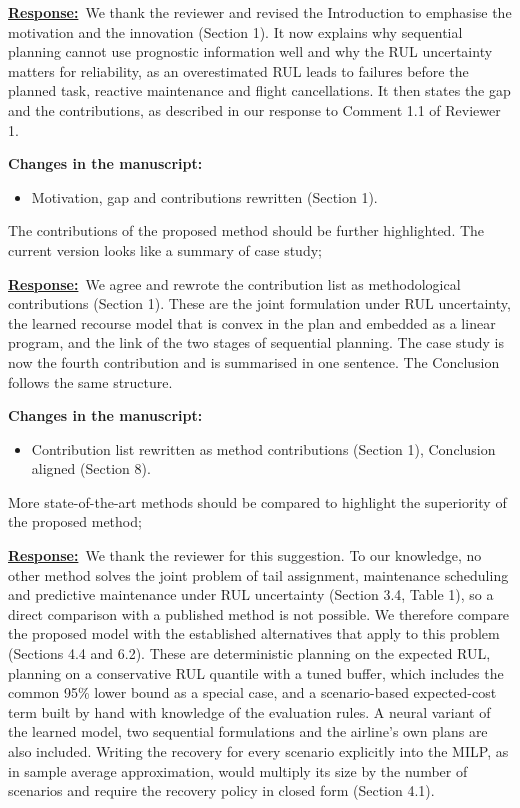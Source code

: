 \documentclass{article}
\newcommand{\response}{\vspace{0.1cm}\noindent\underline{\textbf{Response:}}\ }
\newcommand{\changes}{\vspace{0.1cm}\noindent\textbf{Changes in the manuscript:}}
\begin{document}
\response We thank the reviewer and revised the Introduction to emphasise the motivation and the innovation (Section 1). It now explains why sequential planning cannot use prognostic information well and why the RUL uncertainty matters for reliability, as an overestimated RUL leads to failures before the planned task, reactive maintenance and flight cancellations. It then states the gap and the contributions, as described in our response to Comment 1.1 of Reviewer 1.

\changes
\begin{itemize}[nosep]
\item Motivation, gap and contributions rewritten (Section 1).
\end{itemize}

\begin{cmt}{}{}
The contributions of the proposed method should be further highlighted. The current version looks like a summary of case study;
\end{cmt}

\response We agree and rewrote the contribution list as methodological contributions (Section 1). These are the joint formulation under RUL uncertainty, the learned recourse model that is convex in the plan and embedded as a linear program, and the link of the two stages of sequential planning. The case study is now the fourth contribution and is summarised in one sentence. The Conclusion follows the same structure.

\changes
\begin{itemize}[nosep]
\item Contribution list rewritten as method contributions (Section 1), Conclusion aligned (Section 8).
\end{itemize}

\begin{cmt}{}{}
More state-of-the-art methods should be compared to highlight the superiority of the proposed method;
\end{cmt}

\response We thank the reviewer for this suggestion. To our knowledge, no other method solves the joint problem of tail assignment, maintenance scheduling and predictive maintenance under RUL uncertainty (Section 3.4, Table 1), so a direct comparison with a published method is not possible. We therefore compare the proposed model with the established alternatives that apply to this problem (Sections 4.4 and 6.2). These are deterministic planning on the expected RUL, planning on a conservative RUL quantile with a tuned buffer, which includes the common 95\% lower bound as a special case, and a scenario-based expected-cost term built by hand with knowledge of the evaluation rules. A neural variant of the learned model, two sequential formulations and the airline's own plans are also included. Writing the recovery for every scenario explicitly into the MILP, as in sample average approximation, would multiply its size by the number of scenarios and require the recovery policy in closed form (Section 4.1).
\end{document}
